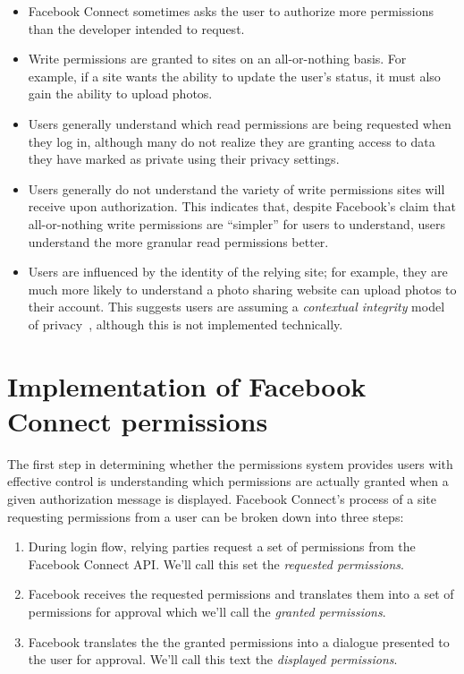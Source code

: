 \documentclass{sig-alternate}
\begin{document}
\begin{itemize}
  \item Facebook Connect sometimes asks the user to authorize more permissions than the developer intended to request.
  \item Write permissions are granted to sites on an all-or-nothing basis. For example, if a site wants the ability to update the user's status, it must also gain the ability to upload photos.
  \item Users generally understand which read permissions are being requested when they log in, although many do not realize they are granting access to data they have marked as private using their privacy settings.
  \item Users generally do not understand the variety of write permissions sites will receive upon authorization. This indicates that, despite Facebook's claim that all-or-nothing write permissions are ``simpler'' for users to understand, users understand the more granular read permissions better.
  \item  Users are influenced by the identity of the relying site; for example, they are much more likely to understand a photo sharing website can upload photos to their account. This suggests users are assuming a \textit{contextual integrity} model of privacy~\cite{contextual-integrity}, although this is not implemented technically.
\end{itemize}

\section{Implementation of Facebook Connect permissions}
\label{sec:implementation}
The first step in determining whether the permissions system provides users with effective control is understanding which permissions are actually granted when a given authorization message is displayed.
Facebook Connect's process of a site requesting permissions from a user can be broken down into three steps:

\begin{enumerate}
  \item During login flow, relying parties request a set of permissions from the Facebook Connect API. We'll call this set the \textit{requested permissions}.
  \item Facebook receives the requested permissions and translates them into a set of permissions for approval which we'll call the \textit{granted permissions}.
  \item Facebook translates the the granted permissions into a dialogue presented to the user for approval. We'll call this text the \textit{displayed permissions}.
\end{enumerate}
\end{document}
